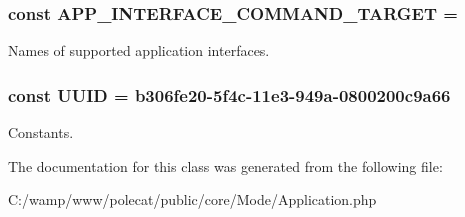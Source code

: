 \subsubsection[{A\+P\+P\+\_\+\+I\+N\+T\+E\+R\+F\+A\+C\+E\+\_\+\+C\+O\+M\+M\+A\+N\+D\+\_\+\+T\+A\+R\+G\+E\+T}]{\setlength{\rightskip}{0pt plus 5cm}const A\+P\+P\+\_\+\+I\+N\+T\+E\+R\+F\+A\+C\+E\+\_\+\+C\+O\+M\+M\+A\+N\+D\+\_\+\+T\+A\+R\+G\+E\+T = \textquotesingle{}}\label{class_able_polecat___mode___application_a37f6c7e337e857be96a70f2e31cadae1}
Names of supported application interfaces. \hypertarget{class_able_polecat___mode___application_a74b892c8c0b86bf9d04c5819898c51e7}{}
\subsubsection[{U\+U\+I\+D}]{\setlength{\rightskip}{0pt plus 5cm}const U\+U\+I\+D = \textquotesingle{}b306fe20-\/5f4c-\/11e3-\/949a-\/0800200c9a66\textquotesingle{}}\label{class_able_polecat___mode___application_a74b892c8c0b86bf9d04c5819898c51e7}
Constants. 

The documentation for this class was generated from the following file\+:\begin{DoxyCompactItemize}
\item 
C\+:/wamp/www/polecat/public/core/\+Mode/Application.\+php\end{DoxyCompactItemize}
